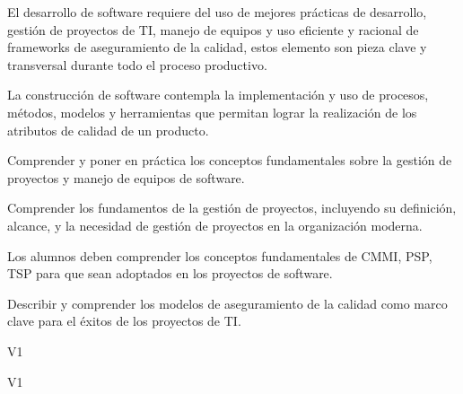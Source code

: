 \begin{syllabus}


\begin{justification}
El desarrollo de software requiere del uso de mejores prácticas de desarrollo, gestión de proyectos de TI, manejo de equipos 
y uso eficiente y racional de frameworks de aseguramiento de la calidad, estos elemento son pieza clave y transversal durante 
todo el proceso productivo.

La construcción de software contempla la implementación y uso de procesos, métodos, modelos y herramientas que permitan lograr 
la realización de los atributos de calidad de un producto.
\end{justification}

\begin{goals}
  \item Comprender y poner en práctica los conceptos fundamentales sobre la gestión de proyectos y manejo de equipos de software.
  \item Comprender los fundamentos de la gestión de proyectos, incluyendo su definición, alcance, y la necesidad de gestión de proyectos en la organización moderna.
  \item Los alumnos deben comprender los conceptos fundamentales de CMMI, PSP, TSP para que sean adoptados en los proyectos de software.
  \item Describir y comprender los modelos de aseguramiento de la calidad como marco clave para el éxitos de los proyectos de TI.
\end{goals}

\begin{outcomes}{V1}
    \item {}
    \item {}
    \item {}
    \item {}
    \item {}
    \item {}
\end{outcomes}

\begin{competences}{V1}
    \item {} 
    \item {}
    \item {} 
    \item {} 
    \item {} 
    \item {} 
    \item {} 
    \item {} 
    \item {}  
\end{competences}


\end{syllabus}

